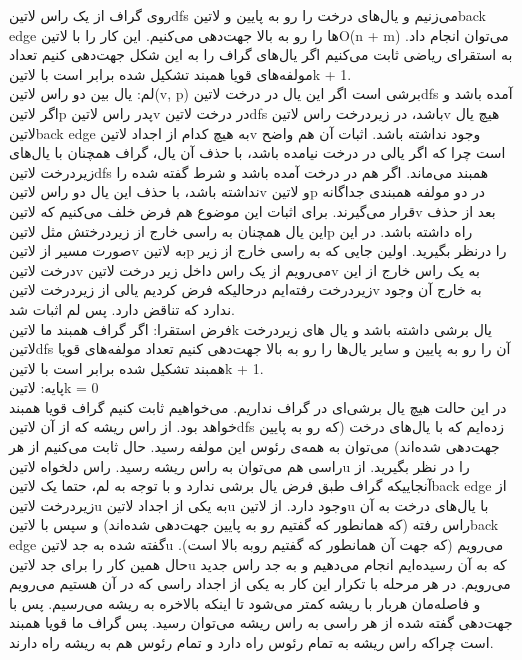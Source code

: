 {روی گراف از یک راس ‌لاتین{dfs} می‌زنیم و یال‌های درخت را رو به پایین و ‌لاتین{back edge} ها را رو به بالا جهت‌دهی می‌کنیم. این کار را با ‌لاتین{O(n + m)} می‌توان انجام داد. به استقرای ریاضی ثابت می‌کنیم اگر یال‌های گراف را به این شکل جهت‌دهی کنیم تعداد مولفه‌های قویا همبند تشکیل شده برابر است با ‌لاتین{k + 1}.\\
لم: یال بین دو راس ‌لاتین{(v, p)} برشی  است اگر این یال در درخت ‌لاتین{dfs} آمده باشد و اگر ‌لاتین{p} پدر راس ‌لاتین{v} در درخت ‌لاتین{dfs} باشد، در زیردرخت راس ‌لاتین{v} هیچ یال ‌لاتین{back edge} به هیچ کدام از اجداد ‌لاتین{v} وجود نداشته باشد. اثبات آن هم واضح است چرا که اگر یالی در درخت نیامده باشد، با حذف آن یال، گراف همچنان با یال‌های زیردرخت ‌لاتین{dfs} همبند می‌ماند. اگر هم در درخت آمده باشد و شرط گفته شده را نداشته باشد، با حذف این یال دو راس ‌لاتین{v} و ‌لاتین{p} در دو مولفه همبندی جداگانه قرار می‌گیرند. برای اثبات این موضوع هم فرض خلف می‌کنیم که ‌لاتین{v} بعد از حذف این یال همچنان به راسی خارج از زیردرختش مثل ‌لاتین{p} راه داشته باشد. در این صورت مسیر از ‌لاتین{v} به ‌لاتین{p} را درنظر بگیرید. اولین جایی که به راسی خارج از زیر درخت ‌لاتین{v} می‌رویم از یک راس داخل زیر درخت ‌لاتین{v} به یک راس خارج از این زیردرخت رفته‌ایم درحالیکه فرض کردیم یالی از زیردرخت ‌لاتین{v} به خارج آن وجود ندارد که تناقض دارد. پس لم اثبات شد.\\
فرض استقرا: اگر گراف همبند ما ‌لاتین{k} یال برشی داشته باشد و یال های زیردرخت ‌لاتین{dfs} آن را رو به پایین و سایر یال‌ها را رو به بالا جهت‌دهی کنیم تعداد مولفه‌های قویا همبند تشکیل شده برابر است با ‌لاتین{k + 1}.\\
پایه: ‌لاتین{k = 0}\\
در این حالت هیچ یال برشی‌ای در گراف نداریم. می‌خواهیم ثابت کنیم گراف قویا همبند خواهد بود. از راس ریشه که از آن ‌لاتین{dfs} زده‌ایم که با یال‌های درخت (که رو به پایین جهت‌دهی شده‌اند) می‌توان به همه‌ی رئوس این مولفه رسید. حال ثابت می‌کنیم از هر راسی هم می‌توان به راس ریشه رسید. راس دلخواه ‌لاتین{u} را در نظر بگیرید. از آنجاییکه گراف طبق فرض یال برشی ندارد و با توجه به لم، حتما یک ‌لاتین{back edge} از زیردرخت ‌لاتین{u} به یکی از اجداد ‌لاتین{u} وجود دارد. از ‌لاتین{u} با یال‌های درخت به آن راس رفته (که همانطور که گفتیم رو به پایین جهت‌دهی شده‌اند) و سپس با ‌لاتین{back edge} گفته شده به جد ‌لاتین{u} می‌رویم (که جهت آن همانطور که گفتیم روبه بالا است). حال همین کار را برای جد ‌لاتین{u} که به آن رسیده‌ایم انجام می‌دهیم و به جد راس جدید می‌رویم. در هر مرحله با تکرار این کار به یکی از اجداد راسی که در آن هستیم می‌رویم و فاصله‌مان هربار با ریشه کمتر می‌شود تا اینکه بالاخره به ریشه می‌رسیم. پس با جهت‌دهی گفته شده از هر راسی به راس ریشه می‌توان رسید. پس گراف ما قویا همبند است چراکه راس ریشه به تمام رئوس راه دارد و تمام رئوس هم به ریشه راه دارند.\\
}
